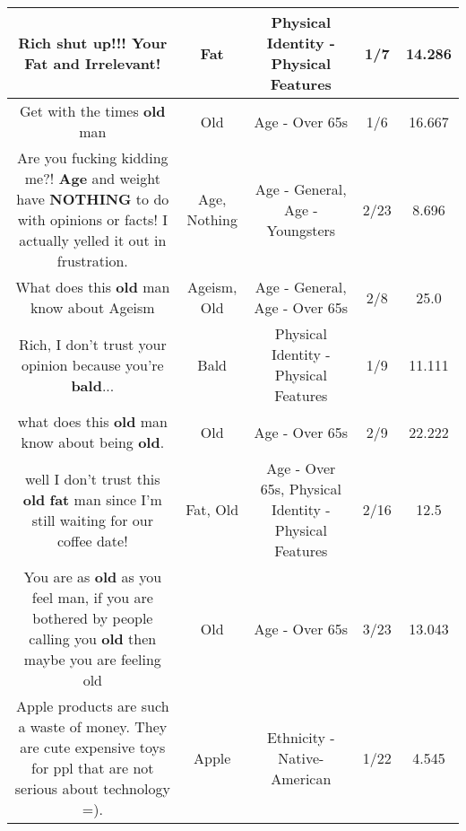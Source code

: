 \documentclass[11pt]{article}
\newlength\mylength
\begin{document}
\begin{center}
\begin{longtable}{|C{.65\mylength}|C{.30\mylength}|C{.12\mylength}|C{.12\mylength}|C{.12\mylength}|}
  \small Rich shut up!!! Your \textbf{Fat} and Irrelevant!\normalsize   & Fat & Physical Identity - Physical Features & 1/7 & 14.286 \\  \hline
  \small Get with the times \textbf{old} man\normalsize   & Old & Age - Over 65s & 1/6 & 16.667 \\  \hline
  \small Are you fucking kidding me?! \textbf{Age} and weight have \textbf{NOTHING} to do with opinions or facts! I actually yelled it out in frustration.\normalsize   & Age, Nothing & Age - General, Age - Youngsters & 2/23 & 8.696 \\  \hline
  \small What does this \textbf{old} man know about Ageism\normalsize   & Ageism, Old & Age - General, Age - Over 65s & 2/8 & 25.0 \\  \hline
  \small Rich, I don't trust your opinion because you're \textbf{bald}...\normalsize   & Bald & Physical Identity - Physical Features & 1/9 & 11.111 \\  \hline
  \small what does this \textbf{old} man know about being \textbf{old}.\normalsize   & Old & Age - Over 65s & 2/9 & 22.222 \\  \hline
  \small well I don't trust this \textbf{old} \textbf{fat} man since I'm still waiting for our coffee date!\normalsize   & Fat, Old & Age - Over 65s, Physical Identity - Physical Features & 2/16 & 12.5 \\  \hline
  \small You are as \textbf{old} as you feel man, if you are bothered by people calling you \textbf{old} then maybe you are feeling old\normalsize   & Old & Age - Over 65s & 3/23 & 13.043 \\  \hline
  \small Apple products are such a waste of money. They are cute expensive toys for ppl that are not serious about technology =).\normalsize   & Apple & Ethnicity - Native-American & 1/22 & 4.545 \\  \hline

\end{longtable}
\end{center}
\end{document}
